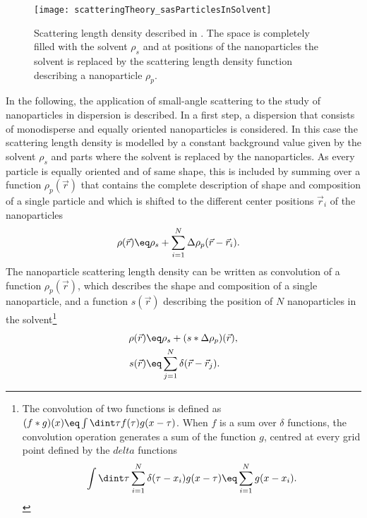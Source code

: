 \documentclass[\main/dresen_thesis.tex]{subfiles}
\begin{document}
\begin{figure}[tb]
  \centering
  \texttt{[image: scatteringTheory\_sasParticlesInSolvent]}
  \caption{\label{fig:theoreticalBackground:scattering:scatteringTheory:sasParticlesInSolvent}Scattering length density described in . The space is completely filled with the solvent $\rho_s$ and at positions of the nanoparticles the solvent is replaced by the scattering length density function describing a nanoparticle $\rho_p$.}
\end{figure}
In the following, the application of small-angle scattering to the study of nanoparticles in dispersion is described.
In a first step, a dispersion that consists of monodisperse and equally oriented nanoparticles is considered.
In this case the scattering length density is modelled by a constant background value given by the solvent $\rho_s$ and parts where the solvent is replaced by the nanoparticles.
As every particle is equally oriented and of same shape, this is included by summing over a function $\rho_p (\vec{r})$ that contains the complete description of shape and composition of a single particle and which is shifted to the different center positions $\vec{r}_i$ of the nanoparticles
\begin{align}
  \rho(\vec{r}) \eq& \rho_s + \sum_{i=1}^N \Delta \rho_{p}(\vec{r} - \vec{r}_i).\label{eq:theoreticalBackground:scattering:scatteringTheory:sasParticlesInSolvent}
\end{align}
The nanoparticle scattering length density can be written as convolution of a function $\rho_{p}(\vec{r})$, which describes the shape and composition of a single nanoparticle, and a function $s(\vec{r})$ describing the position of $N$ nanoparticles in the solvent\footnote{The convolution of two functions is defined as $(f*g)(x) \eq \int \dint \tau f(\tau) g(x-\tau)$.
 When $f$ is a sum over $\delta$ functions, the convolution operation generates a sum of the function $g$, centred at every grid point defined by the $delta$ functions
\begin{equation}
  \int \dint \tau \sum_{i=1}^N \delta(\tau - x_i) g(x-\tau) \eq \sum_{i=1}^N g(x - x_i).
\end{equation}}
\begin{align}
  \rho(\vec{r}) \eq& \rho_s + (s * \Delta \rho_{p})(\vec{r}),\\
  s(\vec{r}) \eq& \sum_{j=1}^N \delta(\vec{r} - \vec{r}_j).
\end{align}
\end{document}
